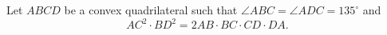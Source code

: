 Let $ABCD$ be a convex quadrilateral such that $\angle{ABC}=\angle{ADC}=135^\circ$ and \[AC^2\cdot BD^2=2AB\cdot BC\cdot CD\cdot DA.\]
